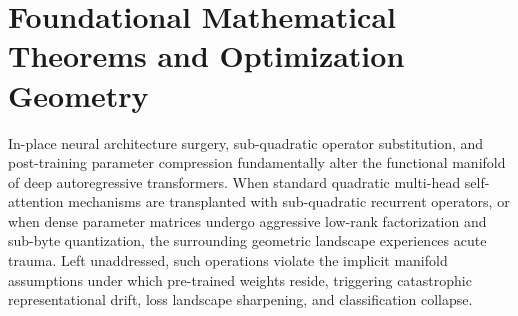 
\providecommand{\sym}{\operatorname{sym}}
\providecommand{\skewop}{\operatorname{skew}}
\providecommand{\qf}{\operatorname{qf}}
\providecommand{\HVP}{\operatorname{HVP}}
\providecommand{\Null}{\operatorname{Null}}
\providecommand{\Vol}{\operatorname{Vol}}
\providecommand{\Grass}{\operatorname{Grass}}
\providecommand{\TopK}{\operatorname{TopK}}
\providecommand{\ULP}{\operatorname{ULP}}

\section{Foundational Mathematical Theorems and Optimization Geometry}
\label{sec:mathematical_foundations}

In-place neural architecture surgery, sub-quadratic operator substitution, and post-training parameter compression fundamentally alter the functional manifold of deep autoregressive transformers. When standard quadratic multi-head self-attention mechanisms are transplanted with sub-quadratic recurrent operators, or when dense parameter matrices undergo aggressive low-rank factorization and sub-byte quantization, the surrounding geometric landscape experiences acute trauma. Left unaddressed, such operations violate the implicit manifold assumptions under which pre-trained weights reside, triggering catastrophic representational drift, loss landscape sharpening, and classification collapse.

